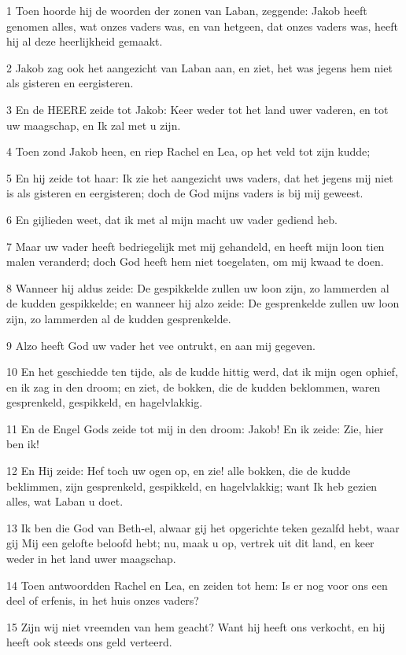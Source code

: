 \par 1 Toen hoorde hij de woorden der zonen van Laban, zeggende: Jakob heeft genomen alles, wat onzes vaders was, en van hetgeen, dat onzes vaders was, heeft hij al deze heerlijkheid gemaakt.
\par 2 Jakob zag ook het aangezicht van Laban aan, en ziet, het was jegens hem niet als gisteren en eergisteren.
\par 3 En de HEERE zeide tot Jakob: Keer weder tot het land uwer vaderen, en tot uw maagschap, en Ik zal met u zijn.
\par 4 Toen zond Jakob heen, en riep Rachel en Lea, op het veld tot zijn kudde;
\par 5 En hij zeide tot haar: Ik zie het aangezicht uws vaders, dat het jegens mij niet is als gisteren en eergisteren; doch de God mijns vaders is bij mij geweest.
\par 6 En gijlieden weet, dat ik met al mijn macht uw vader gediend heb.
\par 7 Maar uw vader heeft bedriegelijk met mij gehandeld, en heeft mijn loon tien malen veranderd; doch God heeft hem niet toegelaten, om mij kwaad te doen.
\par 8 Wanneer hij aldus zeide: De gespikkelde zullen uw loon zijn, zo lammerden al de kudden gespikkelde; en wanneer hij alzo zeide: De gesprenkelde zullen uw loon zijn, zo lammerden al de kudden gesprenkelde.
\par 9 Alzo heeft God uw vader het vee ontrukt, en aan mij gegeven.
\par 10 En het geschiedde ten tijde, als de kudde hittig werd, dat ik mijn ogen ophief, en ik zag in den droom; en ziet, de bokken, die de kudden beklommen, waren gesprenkeld, gespikkeld, en hagelvlakkig.
\par 11 En de Engel Gods zeide tot mij in den droom: Jakob! En ik zeide: Zie, hier ben ik!
\par 12 En Hij zeide: Hef toch uw ogen op, en zie! alle bokken, die de kudde beklimmen, zijn gesprenkeld, gespikkeld, en hagelvlakkig; want Ik heb gezien alles, wat Laban u doet.
\par 13 Ik ben die God van Beth-el, alwaar gij het opgerichte teken gezalfd hebt, waar gij Mij een gelofte beloofd hebt; nu, maak u op, vertrek uit dit land, en keer weder in het land uwer maagschap.
\par 14 Toen antwoordden Rachel en Lea, en zeiden tot hem: Is er nog voor ons een deel of erfenis, in het huis onzes vaders?
\par 15 Zijn wij niet vreemden van hem geacht? Want hij heeft ons verkocht, en hij heeft ook steeds ons geld verteerd.
